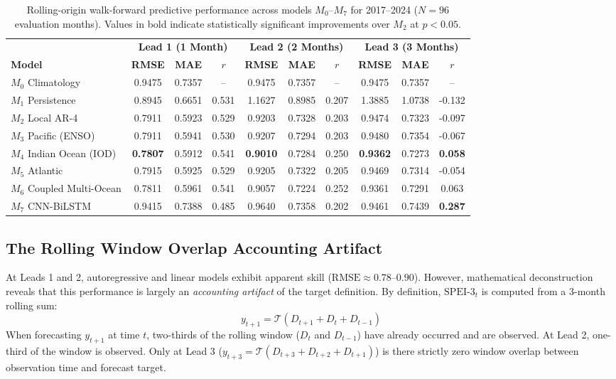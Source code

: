 \documentclass{article}
\begin{document}
\begin{table}[H]
\centering
\small
\caption{Rolling-origin walk-forward predictive performance across models $M_0$--$M_7$ for 2017--2024 ($N = 96$ evaluation months). Values in bold indicate statistically significant improvements over $M_2$ at $p < 0.05$.}
\label{tab:continuous_benchmark}
\begin{tabular}{l ccc ccc ccc}
\toprule
& \multicolumn{3}{c}{\textbf{Lead 1 (1 Month)}} & \multicolumn{3}{c}{\textbf{Lead 2 (2 Months)}} & \multicolumn{3}{c}{\textbf{Lead 3 (3 Months)}} \\
\cmidrule(lr){2-4} \cmidrule(lr){5-7} \cmidrule(lr){8-10}
\textbf{Model} & \textbf{RMSE} & \textbf{MAE} & \textbf{$r$} & \textbf{RMSE} & \textbf{MAE} & \textbf{$r$} & \textbf{RMSE} & \textbf{MAE} & \textbf{$r$} \\
\midrule
$M_0$ Climatology & 0.9475 & 0.7357 & -- & 0.9475 & 0.7357 & -- & 0.9475 & 0.7357 & -- \\
$M_1$ Persistence & 0.8945 & 0.6651 & 0.531 & 1.1627 & 0.8985 & 0.207 & 1.3885 & 1.0738 & -0.132 \\
$M_2$ Local AR-4 & 0.7911 & 0.5923 & 0.529 & 0.9203 & 0.7328 & 0.203 & 0.9474 & 0.7323 & -0.097 \\
$M_3$ Pacific (ENSO) & 0.7911 & 0.5941 & 0.530 & 0.9207 & 0.7294 & 0.203 & 0.9480 & 0.7354 & -0.067 \\
$M_4$ Indian Ocean (IOD) & \textbf{0.7807} & 0.5912 & 0.541 & \textbf{0.9010} & 0.7284 & 0.250 & \textbf{0.9362} & 0.7273 & \textbf{0.058} \\
$M_5$ Atlantic & 0.7915 & 0.5925 & 0.529 & 0.9205 & 0.7322 & 0.205 & 0.9469 & 0.7314 & -0.054 \\
$M_6$ Coupled Multi-Ocean & 0.7811 & 0.5961 & 0.541 & 0.9057 & 0.7224 & 0.252 & 0.9361 & 0.7291 & 0.063 \\
$M_7$ CNN-BiLSTM & 0.9415 & 0.7388 & 0.485 & 0.9640 & 0.7358 & 0.202 & 0.9461 & 0.7439 & \textbf{0.287} \\
\bottomrule
\end{tabular}
\end{table}

\subsection{The Rolling Window Overlap Accounting Artifact}
At Leads 1 and 2, autoregressive and linear models exhibit apparent skill ($\text{RMSE} \approx 0.78$--$0.90$). However, mathematical deconstruction reveals that this performance is largely an \textit{accounting artifact} of the target definition. By definition, $\text{SPEI-3}_t$ is computed from a 3-month rolling sum:
\begin{equation}
y_{t+1} = \mathcal{T}(D_{t+1} + D_t + D_{t-1})
\end{equation}
When forecasting $y_{t+1}$ at time $t$, two-thirds of the rolling window ($D_t$ and $D_{t-1}$) have already occurred and are observed. At Lead 2, one-third of the window is observed. Only at Lead 3 ($y_{t+3} = \mathcal{T}(D_{t+3} + D_{t+2} + D_{t+1})$) is there strictly zero window overlap between observation time and forecast target.
\end{document}
